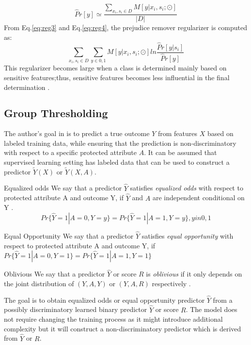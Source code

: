 \documentclass[runningheads]{llncs}
\begin{document}
\begin{equation}
{\hat{P}r[y]} \simeq \frac{\sum_{x_i,s_i \in D}M[y|x_i,s_i;\odot]}{|D|}
\label{eq:reg4}
\end{equation}
From Eq.\ref{eq:reg3} and Eq.\ref{eq:reg4}, the prejudice remover regularizer is computed as:
\begin{equation}
\sum_{x_i,s_i \in D}\sum_{y \in {0,1}}M[y|x_i,s_i;\odot]ln\frac{\hat{P}r[y|s_i]}{\hat{P}r[y]}
\label{eq:reg5}
\end{equation}
This regularizer becomes large when a class is determined mainly based on sensitive features;thus, sensitive features becomes less influential in the final determination \cite{kamishima2012fairness}.
\subsection{Group Thresholding}
The author's goal in \cite{hardt2016equality} is to predict a true outcome $Y$ from features $X$ based on labeled training data, while ensuring that the prediction is non-discriminatory with respect to a specific protected attribute $A$. It can be assumed that supervised learning setting has labeled data that can be used to construct a predictor $\tilde{Y}(X)$ or $\tilde{Y}(X,A)$.
\begin{definition}{Equalized odds}
We say that a predictor $\hat{Y}$ satisfies \textit{equalized odds} with respect to protected attribute A and outcome Y, if $\hat{Y}$ and $A$ are independent conditional on Y \cite{hardt2016equality}.
\begin{equation}
Pr\{\hat{Y} = 1 | A = 0, Y = y\} = Pr\{\hat{Y} = 1 | A = 1, Y = y\}, y in {0,1}
\end{equation}
\end{definition} 
\begin{definition}{Equal Opportunity}
We say that a predictor $\hat{Y}$ satisfies \textit{equal opportunity} with respect to protected attribute A and outcome Y, if 
$Pr\{\hat{Y} = 1 | A = 0, Y = 1\} = Pr\{\hat{Y} = 1 | A = 1, Y = 1\}$
\end{definition}
\begin{definition}{Oblivious}
We say that a predictor $\hat{Y}$ or score $R$ is \textit{oblivious} if it only depends on the joint distribution of $(Y,A,Y)$ or $(Y,A,R)$ respectively \cite{hardt2016equality}.
\end{definition}
The goal is to obtain equalized odds or equal opportunity predictor $\hat{Y}$ from a possibly discriminatory learned binary predictor $\hat{Y}$ or score $R$. The model does not require changing the training process as it might introduce additional complexity but it will construct a non-discriminatory predictor which is derived from $\hat{Y}$ or $R$.
\end{document}
